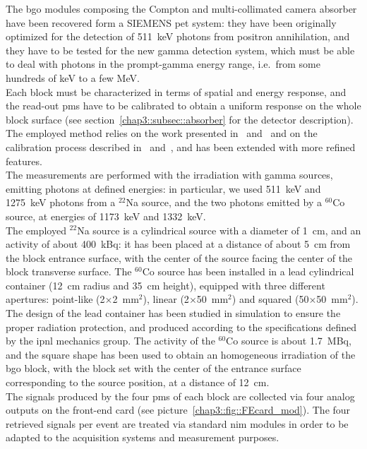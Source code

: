 The \gls{bgo} modules composing the Compton and multi-collimated camera absorber have been recovered form a SIEMENS \gls{pet} system: they have been originally optimized for the detection of 511~keV photons from positron annihilation, and they have to be tested for the new gamma detection system, which must be able to deal with photons in the prompt-gamma energy range, i.e.~from some hundreds of keV to a few MeV.\\ 
Each block must be characterized in terms of spatial and energy response, and the read-out \glspl{pm} have to be calibrated to obtain a uniform response on the whole block surface (see section~\ref{chap3::subsec::absorber} for the detector description). The employed method relies on the work presented in~\cite{Rogers1994} and~\cite{Tornai1994} and on the calibration process described in~\cite{Golnik2015} and~\cite{HuesoGonzalez2015}, and has been extended with more refined features.\\
The measurements are performed with the irradiation with gamma sources, emitting photons at defined energies: in particular, we used 511~keV and 1275~keV photons from a $^{22}$Na source, and the two photons emitted by a $^{60}$Co source, at energies of 1173~keV and 1332~keV.\\
The employed $^{22}$Na source is a cylindrical source with a diameter of 1~cm, and an activity of about 400~kBq: it has been placed at a distance of about 5~cm from the block entrance surface, with the center of the source facing the center of the block transverse surface. The $^{60}$Co source has been installed in a lead cylindrical container (12~cm radius and 35~cm height), equipped with three different apertures: point-like (2$\times$2~mm$^2$), linear (2$\times$50~mm$^2$) and squared (50$\times$50~mm$^2$). The design of the lead container has been studied in simulation to ensure the proper radiation protection, and produced according to the specifications defined by the \gls{ipnl} mechanics group. The activity of the $^{60}$Co source is about 1.7~MBq, and the square shape has been used to obtain an homogeneous irradiation of the \gls{bgo} block, with the block set with the center of the entrance surface corresponding to the source position, at a distance of 12~cm.\\
The signals produced by the four \glspl{pm} of each block are collected via four analog outputs on the front-end card (see picture~\ref{chap3::fig::FEcard_mod}). The four retrieved signals per event are treated via standard \gls{nim} modules in order to be adapted to the acquisition systems and measurement purposes.\\
